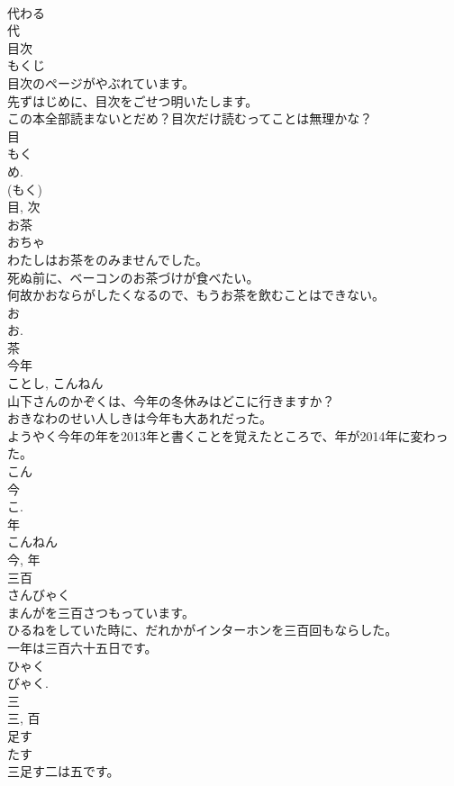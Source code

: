 \documentclass[8pt]{extreport}
\begin{document}
\begin{CJK}{UTF8}{min}
\\	代わる 
\\	代	
\\	目次	
\\	もくじ	
\\	目次のページがやぶれています。	
\\	先ずはじめに、目次をごせつ明いたします。	
\\	この本全部読まないとだめ？目次だけ読むってことは無理かな？	
\\	目 
\\	もく 
\\	め. 
\\	(もく) 
\\	目, 次	
\\	お茶	
\\	おちゃ	
\\	わたしはお茶をのみませんでした。	
\\	死ぬ前に、ベーコンのお茶づけが食べたい。	
\\	何故かおならがしたくなるので、もうお茶を飲むことはできない。	
\\	お 
\\	お. 
\\	茶	
\\	今年	
\\	ことし, こんねん	
\\	山下さんのかぞくは、今年の冬休みはどこに行きますか？	
\\	おきなわのせい人しきは今年も大あれだった。	
\\	ようやく今年の年を2013年と書くことを覚えたところで、年が2014年に変わった。	
\\	こん 
\\	今 
\\	こ. 
\\	年 
\\	こんねん 
\\	今, 年	
\\	三百	
\\	さんびゃく	
\\	まんがを三百さつもっています。	
\\	ひるねをしていた時に、だれかがインターホンを三百回もならした。	
\\	一年は三百六十五日です。	
\\	ひゃく 
\\	びゃく. 
\\	三 
\\	三, 百	
\\	足す	
\\	たす	
\\	三足す二は五です。	

\end{CJK}
\end{document}
